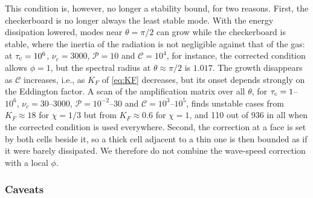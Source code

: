 \documentclass[preprint,12pt,authoryear]{elsarticle}
\newcommand{\calC}{\mathcal{C}}
\newcommand{\calP}{\mathcal{P}}
\begin{document}
This condition is, however, no longer a stability bound, for two reasons. First, the checkerboard is no longer always the least stable mode. With the energy dissipation lowered, modes near $\theta = \pi/2$ can grow while the checkerboard is stable, where the inertia of the radiation is not negligible against that of the gas: at $\tau_{\rm c} = 10^6$, $\nu_c = 3000$, $\calP = 10$ and $\calC = 10^4$, for instance, the corrected condition allows $\phi = 1$, but the spectral radius at $\theta \approx \pi/2$ is $1.017$. The growth disappears as $\calC$ increases, i.e., as $K_F$ of \autoref{eq:KF} decreases, but its onset depends strongly on the Eddington factor. A scan of the amplification matrix over all $\theta$, for $\tau_{\rm c} = 1$--$10^6$, $\nu_c = 30$--$3000$, $\calP = 10^{-2}$--$30$ and $\calC = 10^3$--$10^5$, finds unstable cases from $K_F \approx 18$ for $\chi = 1/3$ but from $K_F \approx 0.6$ for $\chi = 1$, and 110 out of 936 in all when the corrected condition is used everywhere. Second, the correction at a face is set by both cells beside it, so a thick cell adjacent to a thin one is then bounded as if it were barely dissipated. We therefore do not combine the wave-speed correction with a local $\phi$.

\subsubsection{Caveats}
\label{sssec:validity}
\end{document}
